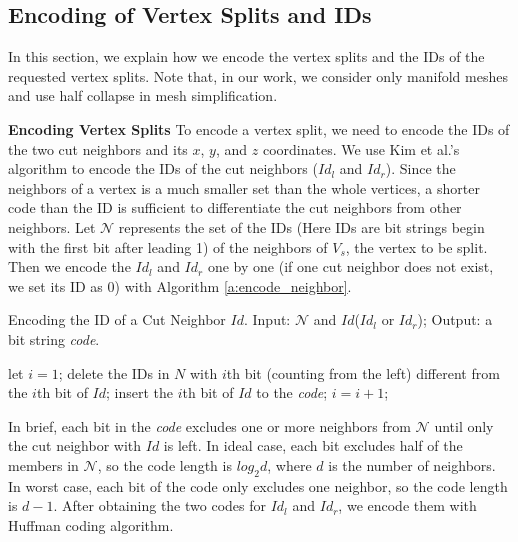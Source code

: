     \subsection{Encoding of Vertex Splits and IDs}
    \label{ss:dstream:encoding}
	In this section, we explain how we encode the vertex splits 
    and the IDs of the requested vertex splits.  
    Note that, in our work, we consider only manifold meshes and use half 
	collapse in mesh simplification.
    
    \textbf{Encoding Vertex Splits}
	To encode a vertex split, we need to encode the IDs of the two
	cut neighbors and its $x$, $y$, and $z$ coordinates.
    We use Kim et al.'s algorithm \cite{multiresolution:kim}
    to encode the IDs of the cut neighbors ($Id_l$ and $Id_r$). 
    Since the neighbors of a vertex is a much smaller set 
    than the whole vertices, a shorter code than the ID is sufficient
    to differentiate the cut neighbors from other neighbors. 
    Let $\mathcal{N}$ represents the set of the IDs 
    (Here IDs are bit strings begin with the first bit after leading 1)
    of the neighbors of $V_s$, the vertex to be split. 
    Then we encode the $Id_l$ and $Id_r$ one by one 
    (if one cut neighbor does not exist, we set its ID as $0$)
    with Algorithm \ref{a:encode_neighbor}.
    \begin{algorithm}
    \caption[Encoding the ID of a Cut Neighbor $Id$.]{Encoding the ID of a Cut Neighbor $Id$. 
    Input: $\mathcal{N}$ and $Id$($Id_l$ or $Id_r$); Output: a bit string \emph{code}.
    \label{a:encode_neighbor}}
    \begin{algorithmic}
    \STATE let $i = 1$;
        \STATE delete the IDs in $N$ with $i$th bit (counting from the left) different from the $i$th bit of $Id$;
            \STATE insert the $i$th bit of $Id$ to the \emph{code};
        \ENDIF
        \STATE $i=i+1$;
    \ENDWHILE
    \end{algorithmic}
    \end{algorithm}
    In brief, each bit in the \emph{code} excludes one or more neighbors
    from $\mathcal{N}$ until only the cut neighbor with $Id$ is left. 
    In ideal case, each bit excludes half of the members
    in $\mathcal{N}$, so the code length is $log_{2}d$, 
    where $d$ is the number of neighbors.
    In worst case, each bit of the code only excludes one neighbor,
    so the code length is $d-1$. 
    After obtaining the two codes for $Id_l$ and $Id_r$, we encode them with Huffman coding algorithm.

